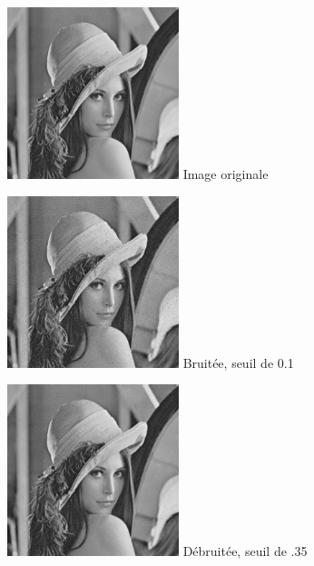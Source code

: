 \documentclass{article}
\begin{document}
		\begin{figure}[!ht]
			\centering
			\begin{minipage}[t]{5cm}
				\centering
				\includegraphics[width=5cm,height=5cm]{lena.jpg}
				Image originale
			\end{minipage}
			\begin{minipage}[t]{5cm}
				\centering
				\includegraphics[width=5cm,height=5cm]{Additive/algo1_10.jpg}
				Bruitée, seuil de 0.1
			\end{minipage}
			\begin{minipage}[t]{5cm}
				\centering
				\includegraphics[width=5cm,height=5cm]{Additive/unset_algo1_10.jpg}
				Débruitée, seuil de .35
			\end{minipage}
		\end{figure}
		
\end{document}
